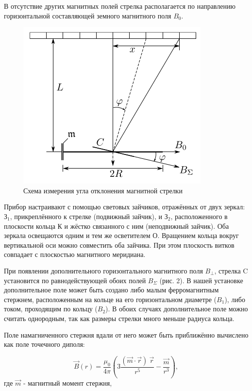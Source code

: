 \documentclass[a4paper]{article}
\begin{document}
В отсутствие других магнитных полей стрелка располагается по направлению
горизонтальной составляющей земного магнитного поля $B_0$.
\begin{figure}[h!]
    \centering
    \includegraphics[width=0.4\pdfpagewidth]{2.png}
    \caption{Схема измерения угла отклонения магнитной стрелки}
\end{figure}

Прибор настраивают с помощью световых зайчиков, отражённых от двух зеркал: $\text{З}_1$,
прикреплённого к стрелке (подвижный зайчик), и $\text{З}_2$,
расположенного в плоскости кольца К и жёстко связанного с ним (неподвижный зайчик).
Оба зеркала освещаются одним и тем же осветителем О.
Вращением кольца вокруг вертикальной оси можно совместить оба зайчика.
При этом плоскость витков совпадает с плоскостью магнитного меридиана.

При появлении дополнительного горизонтального магнитного поля $B_\perp$,
стрелка C установится по равнодействующей обоих полей $B_\Sigma$ (рис. 2).
В нашей установке дополнительное поле может быть создано либо малым ферромагнитным стержнем,
расположенным на кольце на его горизонтальном диаметре ($B_1$), либо током, проходящим по кольцу ($B_2$).
В обоих случаях дополнительное поле можно считать однородным, так как размеры стрелки много меньше радиуса кольца.

Поле намагниченного стержня вдали от него может быть приближённо вычислено как поле точечного диполя:

\begin{equation*}
    \vec{B}(r) = \frac{\mu_0}{4\pi} \left( 3\frac{(\vec{m} \cdot \vec{r}) ~\vec{r} }{r^5} - \frac{\vec{m}}{r^3}\right),
\end{equation*}
где $\vec{m}$ - магнитный момент стержня, 
\end{document}
